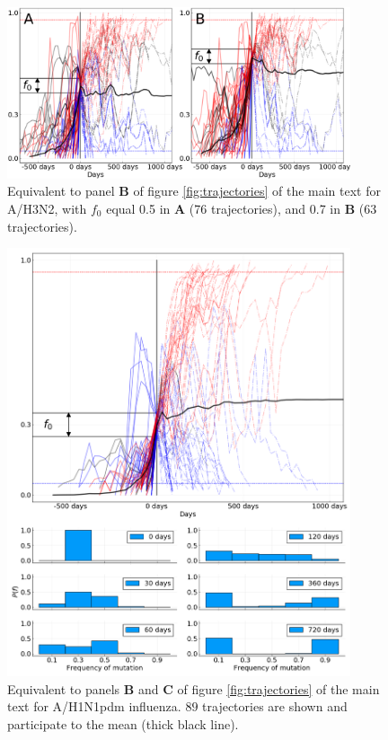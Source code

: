 \documentclass[reprint,amsmath,amssymb,superscriptaddress,showpacs,rmp]{revtex4-1}
\begin{document}
	\begin{figure}
		\centering
		\includegraphics[width=0.9\textwidth]{./SM_figures/ShortTerm_h3n2_varf0.png}
		\caption{Equivalent to panel \textbf{B} of figure \ref{fig:trajectories} of the main text for A/H3N2, with $f_0$ equal 0.5 in \textbf{A} (76 trajectories), and  0.7 in \textbf{B} (63 trajectories).}
		\label{fig:trajectories_h3n2_varf0}
	\end{figure}

	\begin{figure}
		\centering
		\includegraphics[width=0.9\textwidth]{./SM_figures/ShortTerm_h1n1.png}
		\caption{Equivalent to panels \textbf{B} and \textbf{C} of figure \ref{fig:trajectories} of the main text for A/H1N1pdm influenza. $89$ trajectories are shown and participate to the mean (thick black line). }
		\label{fig:trajectories_h1n1}
	\end{figure}
\end{document}

